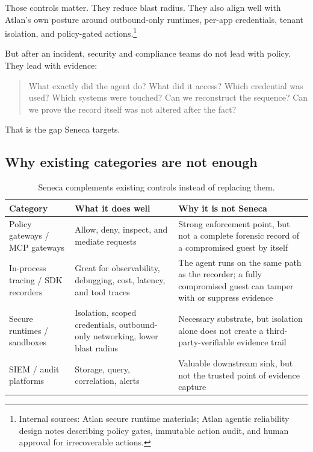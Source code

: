 \documentclass[11pt]{article}
\begin{document}
Those controls matter. They reduce blast radius. They also align well with Atlan's own posture around outbound-only runtimes, per-app credentials, tenant isolation, and policy-gated actions.\footnote{Internal sources: Atlan secure runtime materials; Atlan agentic reliability design notes describing policy gates, immutable action audit, and human approval for irrecoverable actions.}

But after an incident, security and compliance teams do not lead with policy. They lead with evidence:
\begin{quote}
What exactly did the agent do? What did it access? Which credential was used? Which systems were touched? Can we reconstruct the sequence? Can we prove the record itself was not altered after the fact?
\end{quote}

That is the gap Seneca targets.

\subsection{Why existing categories are not enough}

\begin{table}[h]
\centering
\begin{tabular}{p{} p{} p{}}
\toprule
\textbf{Category} & \textbf{What it does well} & \textbf{Why it is not Seneca} \\
\midrule
Policy gateways / MCP gateways & Allow, deny, inspect, and mediate requests & Strong enforcement point, but not a complete forensic record of a compromised guest by itself \\
In-process tracing / SDK recorders & Great for observability, debugging, cost, latency, and tool traces & The agent runs on the same path as the recorder; a fully compromised guest can tamper with or suppress evidence \\
Secure runtimes / sandboxes & Isolation, scoped credentials, outbound-only networking, lower blast radius & Necessary substrate, but isolation alone does not create a third-party-verifiable evidence trail \\
SIEM / audit platforms & Storage, query, correlation, alerts & Valuable downstream sink, but not the trusted point of evidence capture \\
\bottomrule
\end{tabular}
\caption{Seneca complements existing controls instead of replacing them.}
\end{table}
\end{document}
